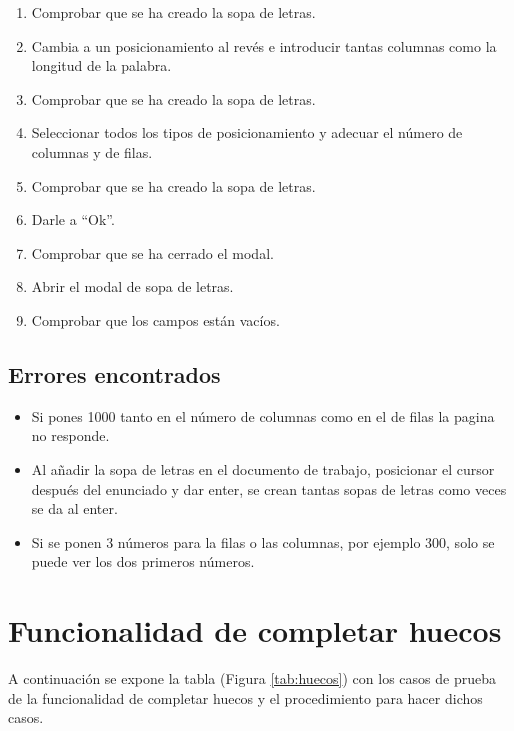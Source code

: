 \begin{enumerate}
    \item Comprobar que se ha creado la sopa de letras.
    \item Cambia a un posicionamiento al revés e introducir tantas columnas como la longitud de la palabra.
    \item Comprobar que se ha creado la sopa de letras.
    \item Seleccionar todos los tipos de posicionamiento y adecuar el número de columnas y de filas.
    \item Comprobar que se ha creado la sopa de letras.
    \item Darle a ``Ok''.
    \item Comprobar que se ha cerrado el modal.
    \item Abrir el modal de sopa de letras.
    \item Comprobar que los campos están vacíos.
\end{enumerate}

\subsection{Errores encontrados}
\label{errores:sopa}
\begin{itemize}
    \item Si pones 1000 tanto en el número de columnas como en el de filas la pagina no responde.
    \item Al añadir la sopa de letras en el documento de trabajo, posicionar el cursor después del enunciado y dar enter, se crean tantas sopas de letras como veces se da al enter.
    \item Si se ponen 3 números para la filas o las columnas, por ejemplo 300, solo se puede ver los dos primeros números.
\end{itemize}

\section{Funcionalidad de completar huecos}
\label{planPruebas:huecos}
A continuación se expone la tabla (Figura \ref{tab:huecos}) con los casos de prueba de la funcionalidad de completar huecos y el procedimiento para hacer dichos casos.

